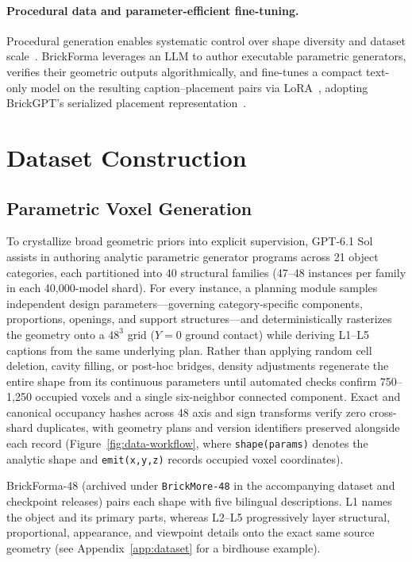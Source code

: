 \documentclass[letterpaper]{article} %
\begin{document}
\paragraph{Procedural data and parameter-efficient fine-tuning.}
Procedural generation enables systematic control over shape diversity and dataset scale~\cite{infinigen}. BrickForma leverages an LLM to author executable parametric generators, verifies their geometric outputs algorithmically, and fine-tunes a compact text-only model on the resulting caption--placement pairs via LoRA~\cite{lora}, adopting BrickGPT's serialized placement representation~\cite{brickgpt}.

\section{Dataset Construction}
\label{sec:dataset}
\subsection{Parametric Voxel Generation}
To crystallize broad geometric priors into explicit supervision, GPT-6.1 Sol assists in authoring analytic parametric generator programs across 21 object categories, each partitioned into 40 structural families (47--48 instances per family in each 40,000-model shard). For every instance, a planning module samples independent design parameters---governing category-specific components, proportions, openings, and support structures---and deterministically rasterizes the geometry onto a $48^3$ grid ($Y{=}0$ ground contact) while deriving L1--L5 captions from the same underlying plan. Rather than applying random cell deletion, cavity filling, or post-hoc bridges, density adjustments regenerate the entire shape from its continuous parameters until automated checks confirm 750--1,250 occupied voxels and a single six-neighbor connected component. Exact and canonical occupancy hashes across 48 axis and sign transforms verify zero cross-shard duplicates, with geometry plans and version identifiers preserved alongside each record (Figure~\ref{fig:data-workflow}, where \texttt{shape(params)} denotes the analytic shape and \texttt{emit(x,y,z)} records occupied voxel coordinates).

BrickForma-48 (archived under \texttt{BrickMore-48} in the accompanying dataset and checkpoint releases) pairs each shape with five bilingual descriptions. L1 names the object and its primary parts, whereas L2--L5 progressively layer structural, proportional, appearance, and viewpoint details onto the exact same source geometry (see Appendix~\ref{app:dataset} for a birdhouse example).
\end{document}
